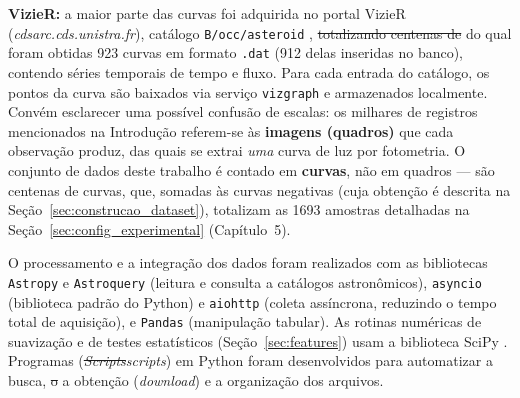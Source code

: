 \documentclass[msc]{on} %
\makeatletter
\providecommand{\DIFaddtex}[1]{{\protect\color{red}#1}} %
\providecommand{\DIFdeltex}[1]{{\protect\color{red}\sout{#1}}} %
\providecommand{\DIFaddbegin}{} %
\providecommand{\DIFaddend}{} %
\providecommand{\DIFdelbegin}{} %
\providecommand{\DIFdelend}{} %
\providecommand{\DIFadd}[1]{\texorpdfstring{\DIFaddtex{#1}}{#1}} %
\providecommand{\DIFdel}[1]{\texorpdfstring{\DIFdeltex{#1}}{}} %
\let\sout@orig\sout %
\renewcommand{\sout}[1]{\ifmmode\text{\sout@orig{\ensuremath{#1}}}\else\sout@orig{#1}\fi} %
\makeatother
\begin{document}
\textbf{VizieR:} a maior parte das curvas foi adquirida no portal VizieR (\textit{cdsarc.cds.unistra.fr}), catálogo \texttt{B/occ/asteroid} \citep{HeraldBocc2016}, \DIFdelbegin \DIFdel{totalizando centenas de }\DIFdelend\ifhmode\hskip0pt\fi \DIFaddbegin \DIFadd{do qual foram obtidas 923 }\DIFaddend curvas em formato \texttt{.dat} \DIFaddbegin \DIFadd{(912 delas inseridas no banco)}\DIFaddend , contendo séries temporais de tempo e fluxo. Para cada entrada do catálogo, os pontos da curva são baixados via serviço \texttt{vizgraph} e armazenados localmente. Convém esclarecer uma possível confusão de escalas: os milhares de registros mencionados na Introdução referem-se às \textbf{imagens (quadros)} que cada observação produz, das quais se extrai \emph{uma} curva de luz por fotometria. O conjunto de dados deste trabalho é contado em \textbf{curvas}, não em quadros --- são centenas de curvas, que, somadas às curvas negativas (cuja obtenção é descrita na Seção~\ref{sec:construcao_dataset}), totalizam as 1693 amostras detalhadas na Seção~\ref{sec:config_experimental} (Capítulo~5).

O processamento e a integração dos dados foram realizados com as bibliotecas \texttt{Astropy} \citep{Astropy2022} e \texttt{Astroquery} \citep{Astroquery2019} (leitura e consulta a catálogos astronômicos), \texttt{asyncio} (biblioteca padrão do Python) e \texttt{aiohttp} (coleta assíncrona, reduzindo o tempo total de aquisição), e \texttt{Pandas} \citep{McKinney2010} (manipulação tabular). As rotinas numéricas de suavização e de testes estatísticos (Seção~\ref{sec:features}) usam a biblioteca SciPy \citep{SciPy2020}. \DIFaddbegin \DIFadd{Programas (}\DIFaddend \textit{\DIFdelbegin \DIFdel{Scripts}\DIFdelend\ifhmode\hskip0pt\fi \DIFaddbegin \DIFadd{scripts}\DIFaddend }\DIFaddbegin \DIFadd{) }\DIFaddend em Python foram desenvolvidos para automatizar a busca, \DIFdelbegin \DIFdel{o }\DIFdelend\ifhmode\hskip0pt\fi \DIFaddbegin \DIFadd{a obtenção (}\DIFaddend \textit{download}\DIFaddbegin \DIFadd{) }\DIFaddend e a organização dos arquivos.
\end{document}
